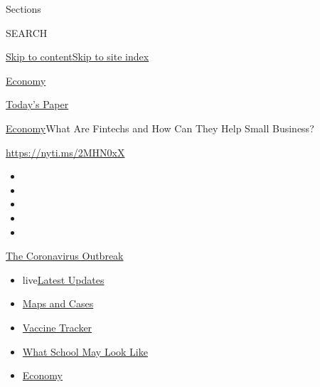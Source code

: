 Sections

SEARCH

\protect\hyperlink{site-content}{Skip to
content}\protect\hyperlink{site-index}{Skip to site index}

\href{https://www.nytimes3xbfgragh.onion/section/business/economy}{Economy}

\href{https://myaccount.nytimes3xbfgragh.onion/auth/login?response_type=cookie\&client_id=vi}{}

\href{https://www.nytimes3xbfgragh.onion/section/todayspaper}{Today's
Paper}

\href{/section/business/economy}{Economy}\textbar{}What Are Fintechs and
How Can They Help Small Business?

\url{https://nyti.ms/2MHN0xX}

\begin{itemize}
\item
\item
\item
\item
\item
\end{itemize}

\href{https://www.nytimes3xbfgragh.onion/news-event/coronavirus?action=click\&pgtype=Article\&state=default\&region=TOP_BANNER\&context=storylines_menu}{The
Coronavirus Outbreak}

\begin{itemize}
\tightlist
\item
  live\href{https://www.nytimes3xbfgragh.onion/2020/08/01/world/coronavirus-covid-19.html?action=click\&pgtype=Article\&state=default\&region=TOP_BANNER\&context=storylines_menu}{Latest
  Updates}
\item
  \href{https://www.nytimes3xbfgragh.onion/interactive/2020/us/coronavirus-us-cases.html?action=click\&pgtype=Article\&state=default\&region=TOP_BANNER\&context=storylines_menu}{Maps
  and Cases}
\item
  \href{https://www.nytimes3xbfgragh.onion/interactive/2020/science/coronavirus-vaccine-tracker.html?action=click\&pgtype=Article\&state=default\&region=TOP_BANNER\&context=storylines_menu}{Vaccine
  Tracker}
\item
  \href{https://www.nytimes3xbfgragh.onion/interactive/2020/07/29/us/schools-reopening-coronavirus.html?action=click\&pgtype=Article\&state=default\&region=TOP_BANNER\&context=storylines_menu}{What
  School May Look Like}
\item
  \href{https://www.nytimes3xbfgragh.onion/live/2020/07/31/business/stock-market-today-coronavirus?action=click\&pgtype=Article\&state=default\&region=TOP_BANNER\&context=storylines_menu}{Economy}
\end{itemize}

